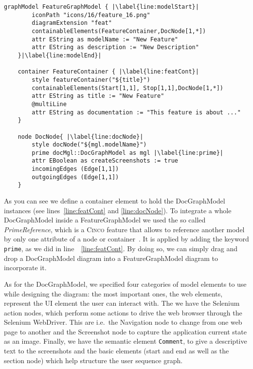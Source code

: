 \begin{lstlisting}[language=MGL, caption={Excerpt from the feature.mgl, meta-specification of the FeatureGraphModel}, label=docMGL, escapechar=|]
    graphModel FeatureGraphModel { |\label{line:modelStart}|
        iconPath "icons/16/feature_16.png"
        diagramExtension "feat"
        containableElements(FeatureContainer,DocNode[1,*])
        attr EString as modelName := "New Feature"
        attr EString as description := "New Description"
    }|\label{line:modelEnd}|
    
    container FeatureContainer { |\label{line:featCont}|
        style featureContainer("${title}")
        containableElements(Start[1,1], Stop[1,1],DocNode[1,*])
        attr EString as title := "New Feature"
        @multiLine
        attr EString as documentation := "This feature is about ..."
    }
    
    node DocNode{ |\label{line:docNode}|
        style docNode("${mgl.modelName}")
        prime docMgl::DocGraphModel as mgl |\label{line:prime}|
        attr EBoolean as createScreenshots := true
        incomingEdges (Edge[1,1])
        outgoingEdges (Edge[1,1])
    }
\end{lstlisting}

As you can see we define a container element to hold the DocGraphModel instances (see lines~\ref{line:featCont} and \ref{line:docNode}). To integrate a whole DocGraphModel inside a FeatureGraphModel we used the so called \textit{PrimeReference}, which is a \textsc{Cinco} feature that allows to reference another model by only one attribute of a node or container~\cite{Cinco}. It is applied by adding the keyword \lstinline[language=MGL]{prime}, as we did in line~~\ref{line:featCont}. By doing so, we can simply drag and drop a DocGraphModel diagram into a FeatureGraphModel diagram to incorporate it.

As for the DocGraphModel, we specified four categories of model elements to use while designing the diagram: the most important ones, the web elements, represent the UI element the user can interact with. The we have the Selenium action nodes, which perform some actions to drive the web browser through the Selenium WebDriver. This are i.e.~the Navigation node to change from one web page to another and the Screenshot node to capture the application current state as an image. Finally, we have the semantic element \lstinline{Comment}, to give a descriptive text to the screenshots and the basic elements (start and end as well as the section node) which help structure the user sequence graph.

